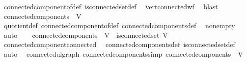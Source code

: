 \begin{isabellebody}
\ connected{\isacharunderscore}{\kern0pt}component{\isacharunderscore}{\kern0pt}of{\isacharunderscore}{\kern0pt}def\ is{\isacharunderscore}{\kern0pt}connected{\isacharunderscore}{\kern0pt}set{\isacharunderscore}{\kern0pt}def\ \isamarkupfalse%
\ vert{\isacharunderscore}{\kern0pt}connected{\isacharunderscore}{\kern0pt}wf\ \isamarkupfalse%
\ blast\isanewline
\ \ \isamarkupfalse%
\ \isamarkupfalse%
\ {\isachardoublequoteopen}connected{\isacharunderscore}{\kern0pt}components\ {\isacharequal}{\kern0pt}\ {\isacharbraceleft}{\kern0pt}V{\isacharbraceright}{\kern0pt}{\isachardoublequoteclose}\ \isamarkupfalse%
\ quotient{\isacharunderscore}{\kern0pt}def\ connected{\isacharunderscore}{\kern0pt}component{\isacharunderscore}{\kern0pt}of{\isacharunderscore}{\kern0pt}def\ connected{\isacharunderscore}{\kern0pt}components{\isacharunderscore}{\kern0pt}def\ \isamarkupfalse%
\ non{\isacharunderscore}{\kern0pt}empty\ \isamarkupfalse%
\ auto\isanewline
{}\isamarkupfalse%
\isanewline
\ \ \isamarkupfalse%
\ {\isachardoublequoteopen}connected{\isacharunderscore}{\kern0pt}components\ {\isacharequal}{\kern0pt}\ {\isacharbraceleft}{\kern0pt}V{\isacharbraceright}{\kern0pt}\ {\isasymLongrightarrow}\ is{\isacharunderscore}{\kern0pt}connected{\isacharunderscore}{\kern0pt}set\ V{\isachardoublequoteclose}\isanewline
\ \ \ \ \isamarkupfalse%
\ connected{\isacharunderscore}{\kern0pt}component{\isacharunderscore}{\kern0pt}connected\ \isamarkupfalse%
\ connected{\isacharunderscore}{\kern0pt}components{\isacharunderscore}{\kern0pt}def\ is{\isacharunderscore}{\kern0pt}connected{\isacharunderscore}{\kern0pt}set{\isacharunderscore}{\kern0pt}def\ \isamarkupfalse%
\ auto\isanewline
{}\isamarkupfalse%
%
\endisatagproof
{\isafoldproof}%
%
\isadelimproof
\isanewline
%
\endisadelimproof
\isanewline
{}\isamarkupfalse%
\isanewline
\isanewline
{}\isamarkupfalse%
\ {\isacharparenleft}{\kern0pt}\ connected{\isacharunderscore}{\kern0pt}ulgraph{\isacharparenright}{\kern0pt}\ connected{\isacharunderscore}{\kern0pt}components{\isacharbrackleft}{\kern0pt}simp{\isacharbrackright}{\kern0pt}{\isacharcolon}{\kern0pt}\ {\isachardoublequoteopen}connected{\isacharunderscore}{\kern0pt}components\ {\isacharequal}{\kern0pt}\ {\isacharbraceleft}{\kern0pt}V{\isacharbraceright}{\kern0pt}{\isachardoublequoteclose}\isanewline
%
\isadelimproof
\ \ %
\endisadelimproof

\end{isabellebody}
